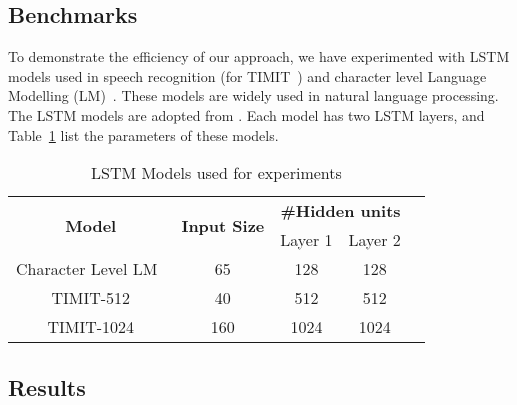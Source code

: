 {\subsection{Benchmarks}
To demonstrate the efficiency of our approach, we have experimented with LSTM models used in speech recognition (for TIMIT~\cite{garofolo1993timit}) and character level Language Modelling (LM)~\cite{sundermeyer2015feedforward}. These models are widely used in natural language processing. The LSTM models are adopted from \cite{azari2020elsa,park2018maximizing,han2017ese}. Each model has two LSTM layers, and Table~\ref{tab:lstmModels} list the parameters of these models.
\begin{table}[]
	\centering
	\caption{LSTM Models used for experiments}
	\begin{tabular}{@{}ccccll@{}}
		\toprule
		\multirow{2}{*}{\textbf{Model}} & \multirow{2}{*}{\textbf{Input Size}} & \multicolumn{2}{c}{\textbf{\#Hidden units}} & \multicolumn{2}{l}{\multirow{5}{*}{}} \\ \cmidrule(lr){3-4}
		&                                      & Layer 1              & Layer 2              & \multicolumn{2}{l}{}                  \\ \cmidrule(r){1-4}
		Character Level LM~\cite{azari2020elsa}                              & 65                                   & 128                  & 128                  & \multicolumn{2}{l}{}                  \\ \cmidrule(r){1-4}
		TIMIT-512 \cite{park2018maximizing}                      & 40                                   & 512                  & 512                  & \multicolumn{2}{l}{}                  \\ \cmidrule(r){1-4}
		TIMIT-1024 \cite{han2017ese}                     & 160                                  & 1024                 & 1024                 & \multicolumn{2}{l}{}                  \\ \bottomrule
	\end{tabular}
	\label{tab:lstmModels}
\end{table}
\subsection{Results}
}
